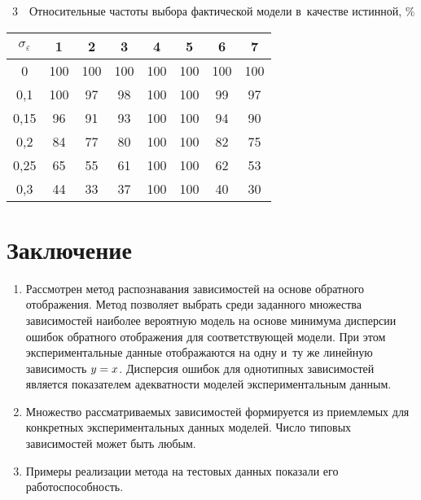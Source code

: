 \begin{multicols}{2}
\pagebreak


 \noindent
\noindent
{{\tablename~3}\ \ \small{Относительные частоты выбора фактической модели в~качестве истинной, \%}}

 \vspace*{6pt}

\begin{center}  %
\tabcolsep=4.8pt
\begin{tabular}{|c|c|c|c|c|c|c|c|}
\hline
$\sigma_\varepsilon$&1&2&3&4&5&6&7\\
\hline
0\hphantom{,99}&100\hphantom{9}&100\hphantom{9}&100\hphantom{9}&100& 
100&100\hphantom{9}&100\hphantom{9}\\
0,1\hphantom{9}&100\hphantom{9}&97&98&100&100&99&97\\
0,15&96&91&93&100&100&94&90\\
0,2\hphantom{9}&84&77&80&100&100&82&75\\
0,25&65&55&61&100&100&62&53\\
0,3\hphantom{9}&44&33&37&100&100&40&30\\
\hline
\end{tabular}
\end{center}
  
\section{Заключение}


\noindent
\begin{enumerate}[1.]
  \item Рассмотрен метод распознавания зависимостей на основе обратного 
отображения. Метод позволяет выбрать среди заданного множества 
зависимостей наиболее вероятную модель на основе минимума дисперсии 
ошибок обратного отображения для соответствующей модели. При этом 
экспериментальные данные отображаются на одну и~ту же линейную 
зависимость $y\hm=x$. Дисперсия ошибок для однотипных зависимостей 
является показателем адекватности моделей экспериментальным данным.
  \item Множество рассматриваемых зависимостей формируется из 
приемлемых для конкретных экспериментальных данных моделей. Число 
типовых зависимостей может быть любым.
  \item Примеры реализации метода на тестовых данных показали его 
работоспособность.
  \end{enumerate}


\end{multicols}

